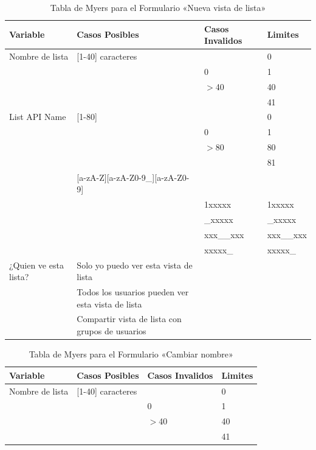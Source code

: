 \begin{table}
\centering
\begin{tabular}{|p{3.0cm}|p{7.0cm}|p{3.0cm}|l|}
\hline
\footnotesize{\textbf{Variable}} & \footnotesize{\textbf{Casos Posibles}} & \footnotesize{\textbf{Casos Invalidos}} & \footnotesize{\textbf{Limites}} \\
\hline
\footnotesize{Nombre de lista} & \footnotesize{[1-40] caracteres} & & \footnotesize{0} \\
& & \footnotesize{0} & \footnotesize{1} \\
& & \footnotesize{$>$40} & \footnotesize{40} \\
& & & \footnotesize{41} \\
\hline
\footnotesize{List API Name} & \footnotesize{[1-80]} & & \footnotesize{0} \\
& & \footnotesize{0} & \footnotesize{1} \\
& & \footnotesize{$>$80} & \footnotesize{80} \\
& & & \footnotesize{81} \\
& \footnotesize{[a-zA-Z][a-zA-Z0-9\_][a-zA-Z0-9]} & & \\
& & \footnotesize{1xxxxx} & \footnotesize{1xxxxx} \\
& & \footnotesize{\_xxxxx} & \footnotesize{\_xxxxx} \\
& & \footnotesize{xxx\_\_xxx} & \footnotesize{xxx\_\_xxx} \\
& & \footnotesize{xxxxx\_} & \footnotesize{xxxxx\_} \\
\hline
\footnotesize{¿Quien ve esta lista?} & \footnotesize{Solo yo puedo ver esta vista de lista} & & \\
& \footnotesize{Todos los usuarios pueden ver esta vista de lista} & & \\
& \footnotesize{Compartir vista de lista con grupos de usuarios} & & \\
\hline
\end{tabular}
\caption{Tabla de Myers para el Formulario «Nueva vista de lista»}
\label{myers_07}
\end{table}

\begin{table}
\centering
\begin{tabular}{|l|l|l|l|}
\hline
\footnotesize{\textbf{Variable}} & \footnotesize{\textbf{Casos Posibles}} & \footnotesize{\textbf{Casos Invalidos}} & \footnotesize{\textbf{Limites}} \\
\hline
\footnotesize{Nombre de lista} & \footnotesize{[1-40] caracteres} & & \footnotesize{0} \\
& & \footnotesize{0} & \footnotesize{1} \\
& & \footnotesize{$>$40} & \footnotesize{40} \\
& & & \footnotesize{41} \\
\hline
\end{tabular}
\caption{Tabla de Myers para el Formulario «Cambiar nombre»}
\label{myers_08}
\end{table}

